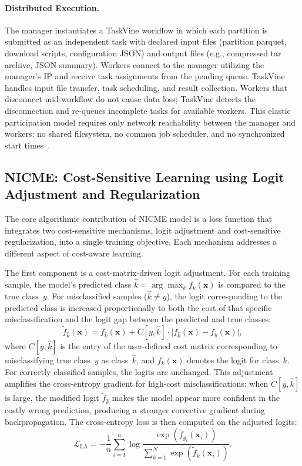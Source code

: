 \documentclass[11pt, letterpaper]{article}
\newcommand{\eg}{e.g.,\xspace}
\begin{document}
\paragraph{Distributed Execution.}
The manager instantiates a TaskVine workflow in which each partition is
submitted as an independent task with declared input files (partition parquet,
download scripts, configuration JSON) and output files (\eg compressed tar archive,
JSON summary). Workers connect to the manager utilizing the manager's IP and receive task
assignments from the pending queue. TaskVine handles input file transfer, task
scheduling, and result collection. Workers that disconnect mid-workflow do not
cause data loss; TaskVine detects the disconnection and re-queues incomplete
tasks for available workers. This elastic participation model requires only
network reachability between the manager and workers: no shared filesystem, no
common job scheduler, and no synchronized start
times~\cite{slydelgado2023taskvine}.

\subsection{NICME: Cost-Sensitive Learning using Logit Adjustment and Regularization}
\label{sec:loss_function}

The core algorithmic contribution of NICME model is a loss function that
integrates two cost-sensitive mechanisms, logit adjustment and cost-sensitive
regularization, into a single training objective. Each mechanism addresses a
different aspect of cost-aware learning.

The first component is a cost-matrix-driven logit adjustment. For each training
sample, the model's predicted class
$\hat{k} = \arg\max_k f_k(\mathbf{x})$ is compared to the true class~$y$. For
misclassified samples ($\hat{k} \neq y$), the logit corresponding to the
predicted class is increased proportionally to both the cost of that specific
misclassification and the logit gap between the predicted and true classes:
%
\begin{equation}
\label{eq:logit_adjust_cost}
\tilde{f}_{\hat{k}}(\mathbf{x}) = f_{\hat{k}}(\mathbf{x})
  + C[y, \hat{k}] \cdot \bigl| f_{\hat{k}}(\mathbf{x})
  - f_y(\mathbf{x}) \bigr|,
\end{equation}
%
where $C[y, \hat{k}]$ is the entry of the user-defined cost matrix
corresponding to misclassifying true class~$y$ as class~$\hat{k}$, and
$f_k(\mathbf{x})$ denotes the logit for class~$k$. For correctly classified
samples, the logits are unchanged. This adjustment amplifies the cross-entropy
gradient for high-cost misclassifications: when $C[y, \hat{k}]$ is large, the
modified logit $\tilde{f}_{\hat{k}}$ makes the model appear more confident in
the costly wrong prediction, producing a stronger corrective gradient during
backpropagation. The cross-entropy loss is then computed on the adjusted logits:
%
\begin{equation}
\label{eq:ce_adjusted}
\mathcal{L}_{\mathrm{LA}} = -\frac{1}{n} \sum_{i=1}^{n}
  \log \frac{\exp(\tilde{f}_{y_i}(\mathbf{x}_i))}
            {\sum_{k=1}^{N} \exp(\tilde{f}_k(\mathbf{x}_i))}.
\end{equation}
\end{document}
